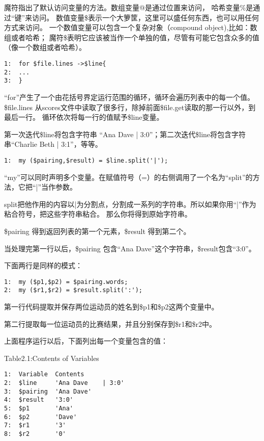 \documentclass[11pt]{ctexart}
\begin{document}
魔符指出了默认访问变量的方法。数组变量@是通过位置来访问，
哈希变量\%是通过“键”来访问。
数值变量\$表示一个大箩筐，这里可以盛任何东西，也可以用任何方式来访问。
一个数值变量可以包含一个复杂对象（compound object),比如：数组或者哈希；
魔符\$表明它应该被当作一个单独的值，尽管有可能它包含众多的值（像一个数组或者哈希）。

\begin{verbatim}
1:  for $file.lines ->$line{
2:  ...
3:  }
\end{verbatim}
“for”产生了一个由花括号界定运行范围的循环，循环会遍历列表中的每一个值。
\$file.lines 从scores文件中读取了很多行，除掉前面\$file.get读取的那一行以外，到最后一行。
循环依次将每一行的值赋予\$line变量。

第一次迭代\$line将包含字符串 “Ana Dave | 3:0”；第二次迭代\$line将包含字符串“Charlie Beth | 3:1”，等等。


\begin{verbatim}
1:  my ($pairing,$result) = $line.split('|');
\end{verbatim}
“my”可以同时声明多个变量。在赋值符号（=）的右侧调用了一个名为“split”的方法，它把“|”当作参数。

split把他作用的内容以|为分割点，分割成一系列的字符串。所以如果你用“|”作为粘合符号，把这些字符串粘合。
那么你将得到原始字符串。

\$pairing 得到返回列表的第一个元素，\$result 得到第二个。

当处理完第一行以后，\$pairing 包含“Ana Dave”这个字符串，\$result包含“3:0”。

下面两行是同样的模式：

\begin{verbatim}
1:  my ($p1,$p2) = $pairing.words;
2:  my ($r1,$r2) = $result.split(':');
\end{verbatim}
第一行代码提取并保存两位运动员的姓名到\$p1和\$p2这两个变量中。

第二行提取每一位运动员的比赛结果，并且分别保存到\$r1和\$r2中。

上面程序运行以后，下面列出每一个变量包含的值：


Table2.1:Contents of Variables

\begin{verbatim}
1:  Variable  Contents               
2:  $line     'Ana Dave    | 3:0' 
3:  $pairing  'Ana Dave'              
4:  $result   '3:0'                   
5:  $p1       'Ana'                   
6:  $p2       'Dave'                  
7:  $r1       '3'                     
8:  $r2       '0'
\end{verbatim}
\end{document}
